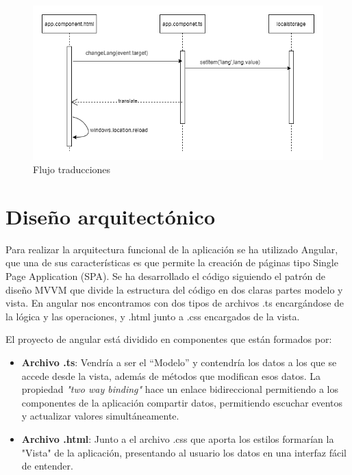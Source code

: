 \begin{figure}[h!] 
\centering
    \includegraphics[width=1\textwidth]{img/traducciones.drawio.png}
\caption{Flujo traducciones}
\label{fig:flujo_traduc}
\end{figure}

\newpage
\section{Diseño arquitectónico}

Para realizar la arquitectura funcional de la aplicación se ha utilizado Angular, que una de sus características es que permite la creación de páginas tipo Single Page Application  (SPA). Se ha desarrollado el código siguiendo el patrón de diseño MVVM que divide la estructura del código en dos claras partes modelo y vista. En angular nos encontramos con dos tipos de archivos .ts encargándose de la lógica y las operaciones, y .html junto a .css encargados de la vista. 

El proyecto de angular está dividido en componentes que están formados por:

\begin{itemize}
    \item \textbf{Archivo .ts}: Vendría a ser el ``Modelo'' y contendría los datos a los que se accede desde la vista, además de métodos que modifican esos datos. La propiedad \textit{"two way binding"} hace un enlace bidireccional permitiendo a los componentes de la aplicación compartir datos, permitiendo escuchar eventos y actualizar valores simultáneamente.
    \item \textbf{Archivo .html}: Junto a el archivo .css que aporta los estilos formarían la "Vista" de la aplicación, presentando al usuario los datos en una interfaz fácil de entender.
\end{itemize}

